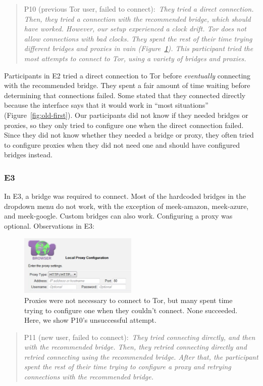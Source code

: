 \documentclass[USenglish,oneside,twocolumn]{article}
\newcommand{\pquote}[2]{
\begin{quotation}
\noindent #1:~\textit{#2}
\end{quotation}
}
\begin{document}
\pquote{P10 (previous Tor user, failed to connect)}{They tried a direct connection. Then, they tried a connection with the recommended bridge, which should have worked. However, our setup experienced a clock drift. Tor does not allow connections with bad clocks. They spent the rest of their time trying different bridges and proxies in vain (Figure~\ref{fig:proxy-attempt}). This participant tried the most attempts to connect to Tor, using a variety of bridges and proxies.}

Participants in E2 tried a direct connection to Tor before {\it eventually} connecting with the recommended bridge.
They spent a fair amount of time waiting before determining that connections failed. Some stated that they connected directly because the interface says that it would work in ``most situations'' (Figure~\ref{fig:old-first}). Our participants did not know if they needed bridges or proxies, so they only tried to configure one when the direct connection failed. Since they did not know whether they needed a bridge or proxy, they often tried to configure proxies when they did not need one and should have configured bridges instead.  

\subsubsection{E3}
In E3, a bridge was required to connect. Most of the hardcoded bridges in the dropdown menu do not work, with the exception of meek-amazon, meek-azure, and meek-google. Custom bridges can also work. Configuring a proxy was optional.
Observations in E3: 

\begin{figure}[t]
\centering
\includegraphics[width=0.5\textwidth]{P8-proxy-attempt.png}
\caption{
Proxies were not necessary to connect to Tor, but many spent time trying to configure one when they couldn't connect. None succeeded. Here, we show P10's unsuccessful attempt. 
}
\label{fig:proxy-attempt}
\end{figure}

\pquote{P11 (new user, failed to connect)}{They tried connecting directly, and then with the recommended bridge. Then, they retried connecting directly and retried connecting using the recommended bridge. After that, the participant spent the rest of their time trying to configure a proxy and retrying connections with the recommended bridge.}
\end{document}
